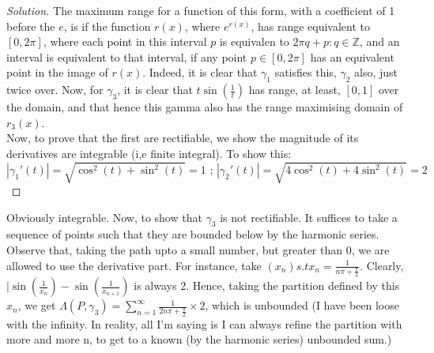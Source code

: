 \documentclass{article}
\newcommand{\Z}{\mathbb{Z}}
\newenvironment{problem}[2][Problem]{\begin{trivlist}
\item[\hskip \labelsep {\bfseries #1}\hskip \labelsep {\bfseries #2.}]}{\end{trivlist}}
\newenvironment{solution}{\begin{proof}[Solution]}{\end{proof}}
\begin{document}
\begin{problem}{6.18}
\end{problem}

\begin{solution}
	The maximum range for a function of this form, with a coefficient of 1 before the $e$, is if the function $r(x)$, where $e^{r(x)}$, has range equivalent to $[0, 2\pi]$, where each point in this interval $p$ is equivalen to ${2\pi q + p: q \in \Z}$, and an interval is equivalent to that interval, if any point $p \in [0, 2\pi]$ has an equivalent point in the image of $r(x)$. Indeed, it is clear that $\gamma_{1}$ satisfies this, $\gamma_{2}$ also, just twice over. Now, for $\gamma_{3}$, it is clear that $t\sin(\frac{1}{t})$ has range, at least, $[0,1]$ over the domain, and that hence this gamma also has the range maximising domain of $r_{3}(x)$. 
	\\
	Now, to prove that the first are rectifiable, we show the magnitude of its derivatives are integrable (i,e finite integral). To show this:
	\[
		|\gamma_{1}'(t)| = \sqrt{\cos^{2}(t) + \sin^{2}(t)} = 1 \textit{ ;  } |\gamma_{2}'(t)| = \sqrt{4\cos^{2}(t)+4\sin^{2}(t)} = 2 
	\]
\end{solution}
Obviously integrable. Now, to show that $\gamma_{3}$ is not rectifiable. It suffices to take a sequence of points such that they are bounded below by the harmonic series. Observe that, taking the path upto a small number, but greater than 0, we are allowed to use the derivative part. For instance, take $(x_n) s.t x_{n} = \frac{1}{n\pi +\frac{\pi}{2}}$. Clearly, $|\sin(\frac{1}{x_{n}}) - \sin(\frac{1}{x_{n+1}})$ is always 2. Hence, taking the partition defined by this $x_n$, we get $\Lambda (P , \gamma_{3}) = \sum_{n=1}^{\infty} \frac{1}{2n\pi +\frac{\pi}{2}}\times 2 $, which is unbounded (I have been loose with the infinity. In reality, all I'm saying is I can always refine the partition with more and more n, to get to a known (by the harmonic series) unbounded sum.)

\begin{problem}{9.19}
\end{problem}{9.19}
\end{document}
